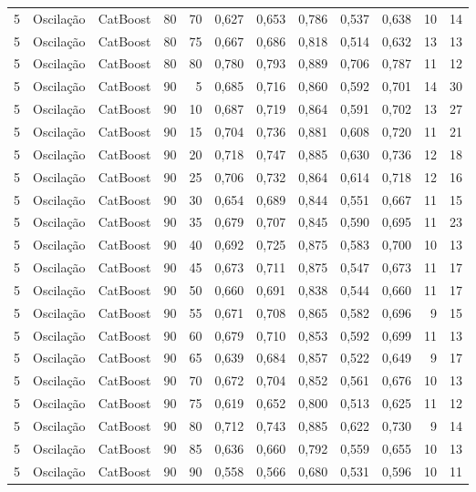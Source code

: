 \begin{longtable}{@{}rllrrrrrrrrr@{}}
5 & Oscilação & CatBoost & 80 & 70 & 0,627 & 0,653 & 0,786 & 0,537 & 0,638 & 10 & 14 \\
5 & Oscilação & CatBoost & 80 & 75 & 0,667 & 0,686 & 0,818 & 0,514 & 0,632 & 13 & 13 \\
5 & Oscilação & CatBoost & 80 & 80 & 0,780 & 0,793 & 0,889 & 0,706 & 0,787 & 11 & 12 \\
5 & Oscilação & CatBoost & 90 & 5 & 0,685 & 0,716 & 0,860 & 0,592 & 0,701 & 14 & 30 \\
5 & Oscilação & CatBoost & 90 & 10 & 0,687 & 0,719 & 0,864 & 0,591 & 0,702 & 13 & 27 \\
5 & Oscilação & CatBoost & 90 & 15 & 0,704 & 0,736 & 0,881 & 0,608 & 0,720 & 11 & 21 \\
5 & Oscilação & CatBoost & 90 & 20 & 0,718 & 0,747 & 0,885 & 0,630 & 0,736 & 12 & 18 \\
5 & Oscilação & CatBoost & 90 & 25 & 0,706 & 0,732 & 0,864 & 0,614 & 0,718 & 12 & 16 \\
5 & Oscilação & CatBoost & 90 & 30 & 0,654 & 0,689 & 0,844 & 0,551 & 0,667 & 11 & 15 \\
5 & Oscilação & CatBoost & 90 & 35 & 0,679 & 0,707 & 0,845 & 0,590 & 0,695 & 11 & 23 \\
5 & Oscilação & CatBoost & 90 & 40 & 0,692 & 0,725 & 0,875 & 0,583 & 0,700 & 10 & 13 \\
5 & Oscilação & CatBoost & 90 & 45 & 0,673 & 0,711 & 0,875 & 0,547 & 0,673 & 11 & 17 \\
5 & Oscilação & CatBoost & 90 & 50 & 0,660 & 0,691 & 0,838 & 0,544 & 0,660 & 11 & 17 \\
5 & Oscilação & CatBoost & 90 & 55 & 0,671 & 0,708 & 0,865 & 0,582 & 0,696 & 9 & 15 \\
5 & Oscilação & CatBoost & 90 & 60 & 0,679 & 0,710 & 0,853 & 0,592 & 0,699 & 11 & 13 \\
5 & Oscilação & CatBoost & 90 & 65 & 0,639 & 0,684 & 0,857 & 0,522 & 0,649 & 9 & 17 \\
5 & Oscilação & CatBoost & 90 & 70 & 0,672 & 0,704 & 0,852 & 0,561 & 0,676 & 10 & 13 \\
5 & Oscilação & CatBoost & 90 & 75 & 0,619 & 0,652 & 0,800 & 0,513 & 0,625 & 11 & 12 \\
5 & Oscilação & CatBoost & 90 & 80 & 0,712 & 0,743 & 0,885 & 0,622 & 0,730 & 9 & 14 \\
5 & Oscilação & CatBoost & 90 & 85 & 0,636 & 0,660 & 0,792 & 0,559 & 0,655 & 10 & 13 \\
5 & Oscilação & CatBoost & 90 & 90 & 0,558 & 0,566 & 0,680 & 0,531 & 0,596 & 10 & 11 \\

\end{longtable}

